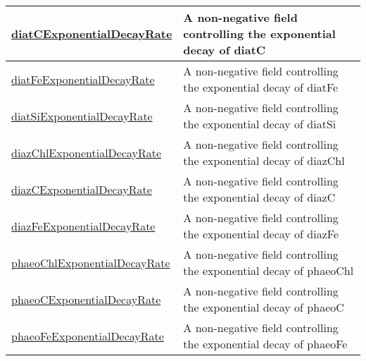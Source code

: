 {\begin{center}
\begin{longtable}{| p{2.0in} | p{4.0in} |}
    \hline
    \hyperref[subsec:var_sec_tracersExponentialDecayFields_diatCExponentialDecayRate]{diatCExponentialDecayRate} & A non-negative field controlling the exponential decay of diatC \\
    \hline
    \hyperref[subsec:var_sec_tracersExponentialDecayFields_diatFeExponentialDecayRate]{diatFeExponentialDecayRate} & A non-negative field controlling the exponential decay of diatFe \\
    \hline
    \hyperref[subsec:var_sec_tracersExponentialDecayFields_diatSiExponentialDecayRate]{diatSiExponentialDecayRate} & A non-negative field controlling the exponential decay of diatSi \\
    \hline
    \hyperref[subsec:var_sec_tracersExponentialDecayFields_diazChlExponentialDecayRate]{diazChlExponentialDecayRate} & A non-negative field controlling the exponential decay of diazChl \\
    \hline
    \hyperref[subsec:var_sec_tracersExponentialDecayFields_diazCExponentialDecayRate]{diazCExponentialDecayRate} & A non-negative field controlling the exponential decay of diazC \\
    \hline
    \hyperref[subsec:var_sec_tracersExponentialDecayFields_diazFeExponentialDecayRate]{diazFeExponentialDecayRate} & A non-negative field controlling the exponential decay of diazFe \\
    \hline
    \hyperref[subsec:var_sec_tracersExponentialDecayFields_phaeoChlExponentialDecayRate]{phaeoChlExponentialDecayRate} & A non-negative field controlling the exponential decay of phaeoChl \\
    \hline
    \hyperref[subsec:var_sec_tracersExponentialDecayFields_phaeoCExponentialDecayRate]{phaeoCExponentialDecayRate} & A non-negative field controlling the exponential decay of phaeoC \\
    \hline
    \hyperref[subsec:var_sec_tracersExponentialDecayFields_phaeoFeExponentialDecayRate]{phaeoFeExponentialDecayRate} & A non-negative field controlling the exponential decay of phaeoFe \\
    \hline
\end{longtable}
\end{center}
}
